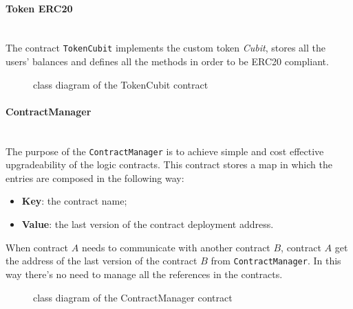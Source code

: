 \paragraph{Token ERC20}\mbox{}\\

\noindent The contract \texttt{TokenCubit} implements the custom token \textit{Cubit}, stores all the users' balances and defines all the methods in order to be ERC20 compliant.
\begin{figure}[H]
	\centering
	\caption{class diagram of the TokenCubit contract}
\end{figure}

\hypertarget{cm}{\paragraph{ContractManager}}\mbox{}\\ 

\noindent The purpose of the \texttt{ContractManager} is to achieve simple and cost effective upgradeability of the logic contracts. This contract stores a map in which the entries are composed in the following way:
\begin{itemize}
	\item\textbf{Key}: the contract name;
	\item\textbf{Value}: the last version of the contract deployment address.
\end{itemize}
When contract $A$ needs to communicate with another contract $B$, contract $A$ get the address of the last version of the contract $B$ from \texttt{ContractManager}. In this way there's no need to manage all the references in the contracts. 
\begin{figure}[H]
	\centering
	\caption{class diagram of the ContractManager contract}
\end{figure}

